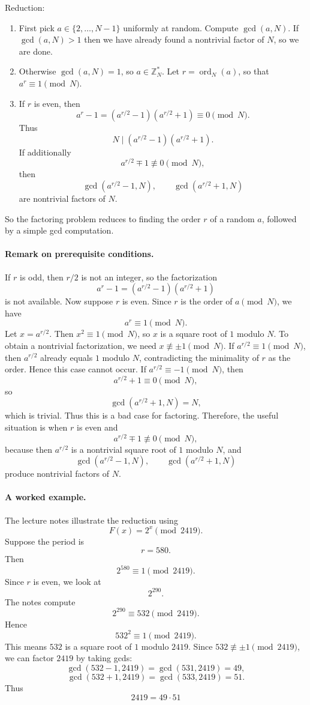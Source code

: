 Reduction: 
\begin{enumerate}
    \item First pick \(a \in \{2,\dots,N-1\}\) uniformly at random. Compute \(\gcd(a,N)\). If \(\gcd(a,N)>1\) then we have already found a nontrivial factor of $N$, so we are done.
    
    \item Otherwise \(\gcd(a,N)=1\), so \(a \in \mathbb{Z}_N^*\). Let $r=\operatorname{ord}_N(a)$, so that \(a^r \equiv 1 \pmod N\).
    
    \item If \(r\) is even, then
    \[
    a^r-1=(a^{r/2}-1)(a^{r/2}+1)\equiv 0 \pmod N.
    \]
    Thus
    \[
    N \mid (a^{r/2}-1)(a^{r/2}+1).
    \]
    If additionally
    \[
    a^{r/2} \mp 1 \not\equiv 0 \pmod N,
    \]
    then
    \[
    \gcd(a^{r/2}-1,N), \qquad \gcd(a^{r/2}+1,N)
    \]
    are nontrivial factors of \(N\).
\end{enumerate}

So the factoring problem reduces to finding the order \(r\) of a random \(a\), followed by a simple gcd computation.
\paragraph{Remark on prerequisite conditions.}
If \(r\) is odd, then \(r/2\) is not an integer, so the factorization
\[
a^r-1=(a^{r/2}-1)(a^{r/2}+1)
\]
is not available. Now suppose \(r\) is even. Since \(r\) is the order of \(a \pmod N\), we have
\[
a^r \equiv 1 \pmod N.
\]
Let \(x=a^{r/2}\). Then \(x^2 \equiv 1 \pmod N\), so \(x\) is a square root of \(1\) modulo \(N\). To obtain a nontrivial factorization, we need \(x \not\equiv \pm 1 \pmod N\). If \(a^{r/2}\equiv 1 \pmod N\), then \(a^{r/2}\) already equals \(1\) modulo \(N\), contradicting the minimality of \(r\) as the order. Hence this case cannot occur.
If \(a^{r/2}\equiv -1 \pmod N\), then
\[
a^{r/2}+1 \equiv 0 \pmod N,
\]
so
\[
\gcd(a^{r/2}+1,N)=N,
\]
which is trivial. Thus this is a bad case for factoring. Therefore, the useful situation is when \(r\) is even and
\[
a^{r/2} \mp 1 \not\equiv 0 \pmod N,
\]
because then \(a^{r/2}\) is a nontrivial square root of \(1\) modulo \(N\), and
\[
\gcd(a^{r/2}-1,N),\qquad \gcd(a^{r/2}+1,N)
\]
produce nontrivial factors of \(N\).

\paragraph{A worked example.} The lecture notes illustrate the reduction using
\[
F(x)=2^x \pmod{2419}.
\]
Suppose the period is
\[
r=580.
\]
Then
\[
2^{580}\equiv 1 \pmod{2419}.
\]
Since \(r\) is even, we look at
\[
2^{290}.
\]
The notes compute
\[
2^{290}\equiv 532 \pmod{2419}.
\]
Hence
\[
532^2 \equiv 1 \pmod{2419}.
\]
This means \(532\) is a square root of \(1\) modulo \(2419\). Since \(532 \not\equiv \pm 1 \pmod{2419}\), we can factor \(2419\) by taking gcds:
\[
\gcd(532-1,2419)=\gcd(531,2419)=49,
\]
\[
\gcd(532+1,2419)=\gcd(533,2419)=51.
\]
Thus
\[
2419 = 49 \cdot 51
\]

